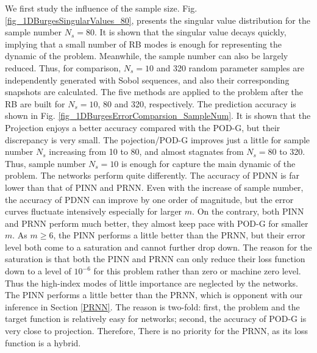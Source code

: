 \documentclass[preprint, 10pt]{elsarticle}
\begin{document}
We first study the influence of the sample size. Fig. \ref{fig_1DBurgesSingularValues_80}, presents the singular value distribution for the sample number $N_s=80$. It is shown that the singular value decays quickly, implying that  a small number of RB modes is enough for representing the dynamic of the problem. Meanwhile, the sample number can also be largely reduced. Thus, for comparison, $N_{s}=10$ and 320 random parameter samples are independently generated with Sobol sequences, and also their corresponding snapshots are calculated. The five methods are applied to the problem after the RB are built for $N_{s}=10$, 80 and 320, respectively. The prediction accuracy is shown in Fig. \ref{fig_1DBurgesErrorComparsion_SampleNum}. It is shown that the Projection enjoys a better accuracy compared with the POD-G, but their discrepancy is very small. The pojection/POD-G improves just a little for sample number $N_s$ increasing from 10 to 80, and almost stagnates from $N_s=80$ to 320. Thus, sample number $N_s=10$ is enough for capture the main dynamic of the problem. The networks perform quite differently. The accuracy of PDNN is far lower than that of PINN and PRNN. Even with the increase of sample number, the accuracy of PDNN can improve by one order of magnitude, but the error curves fluctuate intensively especially for larger $m$. On the contrary, both PINN and PRNN perform much better, they almost keep pace with POD-G for smaller $m$. As $m \ge 6$, the PINN performs a little better than the PRNN, but their error level both come to a saturation and cannot further drop down. The reason for the saturation is that both the PINN and PRNN can only reduce their loss function down to a level of $10^{-6}$ for this problem rather than zero or machine zero level. Thus the high-index modes of little importance are neglected by the networks.  The PINN performs a little better than the PRNN, which is opponent with our inference in Section \ref{PRNN}. The reason is two-fold: first, the problem and the target function is relatively easy for networks; second, the accuracy of POD-G is very close to projection. Therefore, There is no priority for the PRNN, as its loss function is a hybrid.
\end{document}
